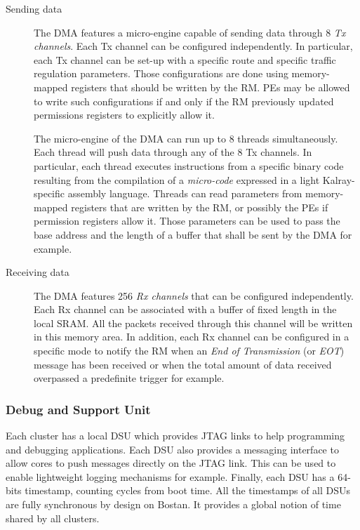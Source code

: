 \documentclass[main.tex]{subfiles}
\begin{document}
\begin{description}
    \item[Sending data]
        The DMA features a micro-engine capable of sending data through 8
        \emph{Tx channels}. Each Tx channel can be configured independently. In
        particular, each Tx channel can be set-up with a specific route and
        specific traffic regulation parameters. Those configurations are done
        using memory-mapped registers that should be written by the RM. PEs may
        be allowed to write such configurations if and only if the RM
        previously updated permissions registers to explicitly allow it. 

        The micro-engine of the DMA can run up to 8 threads simultaneously.
        Each thread will push data through any of the 8 Tx channels. In
        particular, each thread executes instructions from a specific binary
        code resulting from the compilation of a \emph{micro-code} expressed in
        a light Kalray-specific assembly language. Threads can read parameters
        from memory-mapped registers that are written by the RM, or possibly
        the PEs if permission registers allow it. Those parameters can be used
        to pass the base address and the length of a buffer that shall be sent
        by the DMA for example.

    \item[Receiving data]
        The DMA features 256 \emph{Rx channels} that can be configured
        independently. Each Rx channel can be associated with a buffer of fixed
        length in the local SRAM. All the packets received through this channel
        will be written in this memory area. In addition, each Rx channel can
        be configured in a specific mode to notify the RM when an \emph{End of
        Transmission} (or \emph{EOT}) message has been received or when the
        total amount of data received overpassed a predefinite trigger for
        example.
\end{description}

\subsubsection{Debug and Support Unit}
Each cluster has a local DSU which provides JTAG links to help programming and
debugging applications. Each DSU also provides a messaging interface to allow
cores to push messages directly on the JTAG link. This can be used to enable
lightweight logging mechanisms for example. Finally, each DSU has a 64-bits
timestamp, counting cycles from boot time. All the timestamps of all DSUs are
fully synchronous by design on Bostan. It provides a global notion of time
shared by all clusters.
\end{document}

